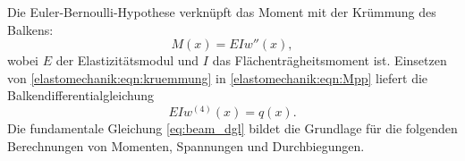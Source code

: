 Die Euler-Bernoulli-Hypothese verknüpft das Moment mit der 
Krümmung des Balkens:
\begin{equation*}
  M(x) = EIw''(x),
\label{elastomechanik:eqn:kruemmung}
\end{equation*}
wobei \(E\) der Elastizitätsmodul und \(I\) das Flächenträgheitsmoment ist. 
Einsetzen
von
\eqref{elastomechanik:eqn:kruemmung}
in
\eqref{elastomechanik:eqn:Mpp}
liefert die Balkendifferentialgleichung
\begin{equation*}
  EIw^{(4)}(x) = q(x).
  \label{eq:beam_dgl}
\end{equation*}
Die fundamentale Gleichung \eqref{eq:beam_dgl}
bildet die Grundlage für die folgenden 
Berechnungen von Momenten, Spannungen und Durchbiegungen.


